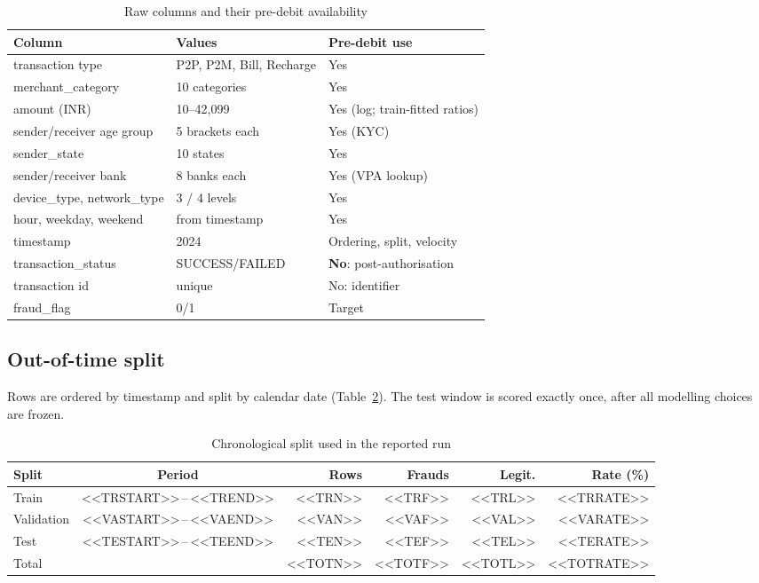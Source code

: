 \documentclass[conference]{IEEEtran}
\begin{document}
\begin{table}[t]
\centering
\caption{Raw columns and their pre-debit availability}\label{tab:schema}
\footnotesize
\setlength{\tabcolsep}{3pt}
\begin{tabular}{@{}p{2.45cm}p{2.25cm}p{2.85cm}@{}}
\toprule
Column & Values & Pre-debit use \\
\midrule
transaction type & P2P, P2M, Bill, Recharge & Yes \\
merchant\_category & 10 categories & Yes \\
amount (INR) & 10--42,099 & Yes (log; train-fitted ratios) \\
sender/receiver age group & 5 brackets each & Yes (KYC) \\
sender\_state & 10 states & Yes \\
sender/receiver bank & 8 banks each & Yes (VPA lookup) \\
device\_type, network\_type & 3 / 4 levels & Yes \\
hour, weekday, weekend & from timestamp & Yes \\
timestamp & 2024 & Ordering, split, velocity \\
transaction\_status & SUCCESS/FAILED & \textbf{No}: post-authorisation \\
transaction id & unique & No: identifier \\
fraud\_flag & 0/1 & Target \\
\bottomrule
\end{tabular}
\end{table}

\subsection{Out-of-time split}
Rows are ordered by timestamp and split by calendar date (Table~\ref{tab:split}). The test window is scored exactly once, after all modelling choices are frozen.

\begin{table}[t]
\centering
\caption{Chronological split used in the reported run}\label{tab:split}
\footnotesize
\setlength{\tabcolsep}{3pt}
\begin{tabular}{@{}lcrrrr@{}}
\toprule
Split & Period & Rows & Frauds & Legit. & Rate (\%) \\
\midrule
Train & <<TRSTART>>\,--\,<<TREND>> & <<TRN>> & <<TRF>> & <<TRL>> & <<TRRATE>> \\
Validation & <<VASTART>>\,--\,<<VAEND>> & <<VAN>> & <<VAF>> & <<VAL>> & <<VARATE>> \\
Test & <<TESTART>>\,--\,<<TEEND>> & <<TEN>> & <<TEF>> & <<TEL>> & <<TERATE>> \\
\midrule
Total & & <<TOTN>> & <<TOTF>> & <<TOTL>> & <<TOTRATE>> \\
\bottomrule
\end{tabular}
\end{table}
\end{document}
